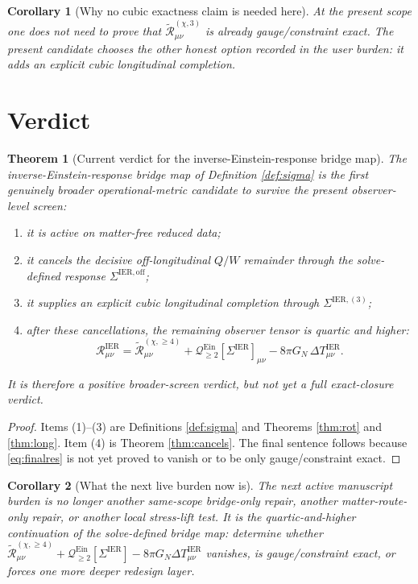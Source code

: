 \documentclass[11pt]{article}
\newcommand{\SigmaIER}{\Sigma^{\mathrm{IER}}}
\newcommand{\SigmaOff}{\Sigma^{\mathrm{IER,off}}}
\newcommand{\SigmaLongThree}{\Sigma^{\mathrm{IER},(3)}}
\newcommand{\ReLongThree}{\widetilde{\mathcal R}_{\mu\nu}^{(\chi,3)}}
\newcommand{\ReLongFour}{\widetilde{\mathcal R}_{\mu\nu}^{(\chi,\ge 4)}}
\newcommand{\DeltaTIER}{\Delta T_{\mu\nu}^{\mathrm{IER}}}
\newcommand{\EinQuad}{\mathcal Q_{\ge 2}^{\mathrm{Ein}}}
\newtheorem{corollary}{Corollary}
\newtheorem{theorem}{Theorem}
\begin{document}
\begin{corollary}[Why no cubic exactness claim is needed here]
\label{cor:noexactness}
At the present scope one does not need to prove that \(\ReLongThree\) is already gauge/constraint exact. The present candidate chooses the other honest option recorded in the user burden: it adds an explicit cubic longitudinal completion.
\end{corollary}

\section{Verdict}

\begin{theorem}[Current verdict for the inverse-Einstein-response bridge map]
\label{thm:verdict}
The inverse-Einstein-response bridge map of Definition \ref{def:sigma} is the first genuinely broader operational-metric candidate to survive the present observer-level screen:
\begin{enumerate}
    \item it is active on matter-free reduced data;
    \item it cancels the decisive off-longitudinal \(Q/W\) remainder through the solve-defined response \(\SigmaOff\);
    \item it supplies an explicit cubic longitudinal completion through \(\SigmaLongThree\);
    \item after these cancellations, the remaining observer tensor is quartic and higher:
    \begin{equation}
    \mathcal R_{\mu\nu}^{\mathrm{IER}}
    =
    \ReLongFour
    +\EinQuad[\SigmaIER]_{\mu\nu}
    -8\pi G_N\,\DeltaTIER.
    \label{eq:finalres}
    \end{equation}
\end{enumerate}
It is therefore a positive broader-screen verdict, but not yet a full exact-closure verdict.
\end{theorem}

\begin{proof}
Items (1)--(3) are Definitions \ref{def:sigma} and Theorems \ref{thm:rot} and \ref{thm:long}. Item (4) is Theorem \ref{thm:cancels}. The final sentence follows because \eqref{eq:finalres} is not yet proved to vanish or to be only gauge/constraint exact.
\end{proof}

\begin{corollary}[What the next live burden now is]
\label{cor:next}
The next active manuscript burden is no longer another same-scope bridge-only repair, another matter-route-only repair, or another local stress-lift test. It is the quartic-and-higher continuation of the solve-defined bridge map: determine whether \(\ReLongFour+\EinQuad[\SigmaIER]-8\pi G_N\DeltaTIER\) vanishes, is gauge/constraint exact, or forces one more deeper redesign layer.
\end{corollary}
\end{document}
